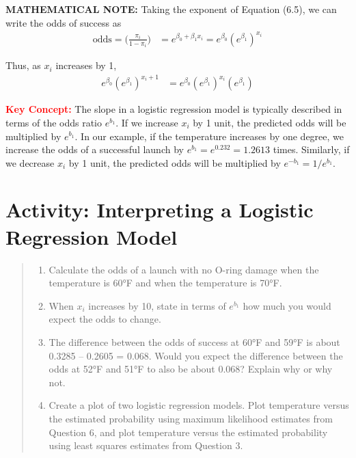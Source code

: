 \documentclass[
]{report}
\providecommand{\tightlist}{%
  \setlength{\itemsep}{0pt}\setlength{\parskip}{0pt}}
\begin{document}
\large

\textbf{MATHEMATICAL NOTE:}
Taking the exponent of Equation (6.5), we can write the odds of success as
\begin{align}
\text{odds} = \biggl(\frac{\pi_i}{1 - \pi_i}\biggr) &= e^{\beta_0 + \beta_1 x_i} = e^{\beta_0}(e^{\beta_1})^{x_i} \tag{6.11}
\end{align}

Thus, as \(x_i\) increases by 1,
\begin{align}
e^{\beta_0}(e^{\beta_1})^{x_i + 1} &= e^{\beta_0}(e^{\beta_1})^{x_i}(e^{\beta_1}) \tag{6.12}
\end{align}

\normalsize

\Large

\textbf{\textcolor{red}{Key Concept:}}
\color{red}
The slope in a logistic regression model is typically described in terms of the odds ratio \(e^{b_1}\). If we increase \(x_i\) by 1 unit, the predicted odds will be multiplied by \(e^{b_1}\). In our example, if the temperature increases by one degree, we increase the odds of a successful launch by \(e^{b_1} = e^{0.232} = 1.2613\) times. Similarly, if we decrease \(x_i\) by 1 unit, the predicted odds will be multiplied by \(e^{-b_1} = 1/e^{b_1}\).
\color{black}
\normalsize

\hypertarget{activity-interpreting-a-logistic-regression-model}{%
\section*{Activity: Interpreting a Logistic Regression Model}\label{activity-interpreting-a-logistic-regression-model}}

\begin{quote}
\begin{enumerate}
\def\labelenumi{\arabic{enumi}.}
\setcounter{enumi}{7}
\tightlist
\item
  Calculate the odds of a launch with no O-ring damage when the temperature is 60°F and when the temperature is 70°F.\\
\item
  When \(x_i\) increases by 10, state in terms of \(e^{b_1}\) how much you would expect the odds to change.\\
\item
  The difference between the odds of success at 60°F and 59°F is about 0.3285 -- 0.2605 = 0.068. Would you expect the difference between the odds at 52°F and 51°F to also be about 0.068? Explain why or why not.\\
\item
  Create a plot of two logistic regression models. Plot temperature versus the estimated probability using maximum likelihood estimates from Question 6, and plot temperature versus the estimated probability using least squares estimates from Question 3.
\end{enumerate}
\end{quote}
\end{document}
